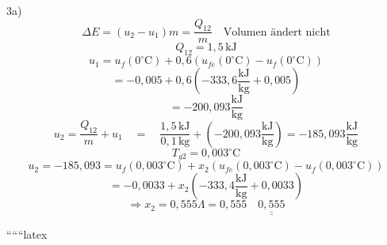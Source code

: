 3a)
\[
\Delta E = (u_2 - u_1) m = \frac{Q_{12}}{m} \quad \text{Volumen ändert nicht}
\]
\[
Q_{12} = 1,5 \, \text{kJ}
\]
\[
u_1 = u_f(0^\circ \text{C}) + 0,6 \left( u_{fe}(0^\circ \text{C}) - u_f(0^\circ \text{C}) \right)
\]
\[
= -0,005 + 0,6 \left( -333,6 \frac{\text{kJ}}{\text{kg}} + 0,005 \right)
\]
\[
= -200,093 \frac{\text{kJ}}{\text{kg}}
\]
\[
u_2 = \frac{Q_{12}}{m} + u_1 \quad = \quad \frac{1,5 \, \text{kJ}}{0,1 \, \text{kg}} + (-200,093 \frac{\text{kJ}}{\text{kg}}) = -185,093 \frac{\text{kJ}}{\text{kg}}
\]
\[
T_{g2} = 0,003^\circ \text{C}
\]
\[
u_2 = -185,093 = u_f(0,003^\circ \text{C}) + x_2 \left( u_{fe}(0,003^\circ \text{C}) - u_f(0,003^\circ \text{C}) \right)
\]
\[
= -0,0033 + x_2 \left( -333,4 \frac{\text{kJ}}{\text{kg}} + 0,0033 \right)
\]
\[
\Rightarrow x_2 = 0,555 \Lambda = 0,555 \quad \underline{\underline{0,555}}
\]

``````latex